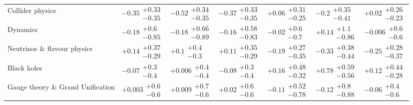 \begin{table}[H]
\begin{tabular}{lllllll}
Collider physics                          &  $\bm{-0.35}\substack{+0.33 \\ -0.35}$ &  $\bm{-0.52}\substack{+0.34 \\ -0.35}$ &  $\bm{-0.37}\substack{+0.33 \\ -0.35}$ &       $+0.06\substack{+0.31 \\ -0.25}$ &        $-0.2\substack{+0.35 \\ -0.41}$ &       $+0.02\substack{+0.26 \\ -0.23}$ \\
Dynamics                                  &        $-0.18\substack{+0.6 \\ -0.85}$ &       $-0.18\substack{+0.66 \\ -0.89}$ &       $-0.16\substack{+0.58 \\ -0.83}$ &         $-0.02\substack{+0.6 \\ -0.7}$ &        $+0.14\substack{+1.1 \\ -0.86}$ &        $-0.006\substack{+0.6 \\ -0.6}$ \\
Neutrinos \& flavour physics              &       $+0.14\substack{+0.37 \\ -0.29}$ &          $+0.1\substack{+0.4 \\ -0.3}$ &       $+0.11\substack{+0.35 \\ -0.29}$ &       $-0.19\substack{+0.27 \\ -0.35}$ &       $-0.33\substack{+0.38 \\ -0.44}$ &       $-0.25\substack{+0.28 \\ -0.37}$ \\
Black holes                               &         $-0.07\substack{+0.3 \\ -0.4}$ &        $+0.006\substack{+0.4 \\ -0.4}$ &         $-0.08\substack{+0.3 \\ -0.4}$ &       $+0.16\substack{+0.48 \\ -0.32}$ &  $\bm{+0.78}\substack{+0.59 \\ -0.56}$ &       $+0.12\substack{+0.44 \\ -0.28}$ \\
Gauge theory \& Grand Unification         &        $+0.003\substack{+0.6 \\ -0.6}$ &        $+0.009\substack{+0.7 \\ -0.6}$ &         $+0.02\substack{+0.6 \\ -0.6}$ &       $-0.11\substack{+0.52 \\ -0.78}$ &        $-0.12\substack{+0.8 \\ -0.88}$ &         $-0.06\substack{+0.4 \\ -0.6}$ \\

\end{tabular}
\end{table}
